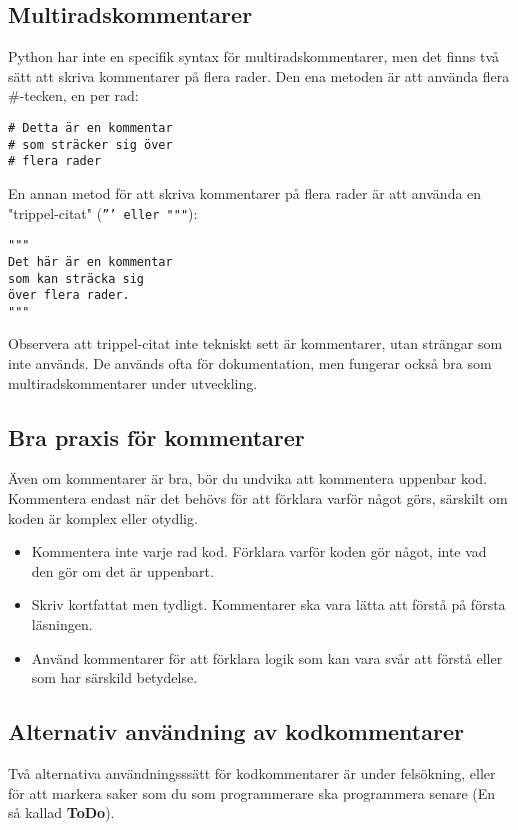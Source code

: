 \subsection{Multiradskommentarer}
Python har inte en specifik syntax för multiradskommentarer, men det finns två sätt att skriva kommentarer på flera rader. Den ena metoden är att använda flera \#-tecken, en per rad:

\begin{lstlisting}[title=Exempel på multiradskommentarer med \#]
# Detta är en kommentar
# som sträcker sig över
# flera rader
\end{lstlisting}

En annan metod för att skriva kommentarer på flera rader är att använda en "trippel-citat" (\texttt{''' eller """}):

\begin{lstlisting}[title=Exempel på multiradskommentarer med trippel-citat]
"""
Det här är en kommentar
som kan sträcka sig
över flera rader.
"""
\end{lstlisting}

Observera att trippel-citat inte tekniskt sett är kommentarer, utan strängar som inte används. De används ofta för dokumentation, men fungerar också bra som multiradskommentarer under utveckling.

\subsection{Bra praxis för kommentarer}
Även om kommentarer är bra, bör du undvika att kommentera uppenbar kod. Kommentera endast när det behövs för att förklara varför något görs, särskilt om koden är komplex eller otydlig.

\begin{itemize}
    \item Kommentera inte varje rad kod. Förklara varför koden gör något, inte vad den gör om det är uppenbart.
    \item Skriv kortfattat men tydligt. Kommentarer ska vara lätta att förstå på första läsningen.
    \item Använd kommentarer för att förklara logik som kan vara svår att förstå eller som har särskild betydelse.
\end{itemize}

\subsection{Alternativ användning av kodkommentarer}
Två alternativa användningsssätt för kodkommentarer är under felsökning, eller för att markera saker som du som programmerare ska programmera senare (En så kallad \textbf{ToDo}).

